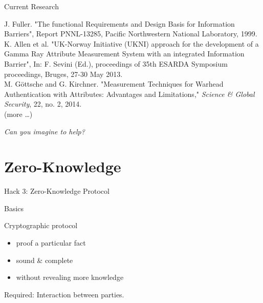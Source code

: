 \documentclass[presentation]{beamer}
\begin{document}
\begin{frame}[label=sec-4-6]{Current Research}
\footnotesize

J. Fuller. "The functional Requirements and Design Basis for Information Barriers", Report PNNL-13285, Pacific Northwestern National Laboratory, 1999.\\[0.3em]

K. Allen et al. "UK-Norway Initiative (UKNI) approach for the development of a Gamma Ray Attribute Measurement System with an integrated Information Barrier", In: F. Sevini (Ed.), proceedings of 35th ESARDA Symposium proceedings, Bruges, 27-30 May 2013.\\[0.3em]

M. Göttsche and G. Kirchner. "Measurement Techniques for Warhead Authentication with Attributes: Advantages and Limitations," \emph{Science \& Global Security}, 22, no. 2, 2014.\\[0.3em]

(more \ldots{})


\pause

\vspace{1cm}

\begin{center}
\emph{Can you imagine to help?}
\end{center}
\end{frame}

\section{Zero-Knowledge}
\label{sec-5}
\begin{frame}[label=sec-5-1]{}
\begin{center}
Hack 3: Zero-Knowledge Protocol
\end{center}
\end{frame}
\begin{frame}[label=sec-5-2]{Basics}
\begin{block}{Cryptographic protocol}
\begin{itemize}
\item proof a particular fact
\item sound \& complete
\item without revealing more knowledge
\end{itemize}

Required: \alert{Interaction} between parties.
\end{block}
\end{frame}
\end{document}
